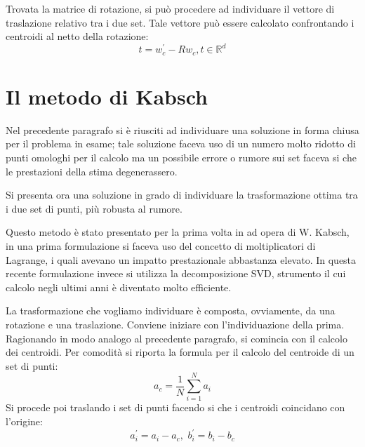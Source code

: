 Trovata la matrice di rotazione, si può procedere ad individuare il vettore di traslazione relativo tra i due set. Tale vettore può essere calcolato confrontando i centroidi al netto della rotazione:
\begin{equation}
t = w_c^{'} - Rw_c, t \in \mathbb{R}^d
\end{equation}

\section{Il metodo di Kabsch}
\label{sec:kabsch}

Nel precedente paragrafo si è riusciti ad individuare una soluzione in forma chiusa per il problema in esame; tale soluzione faceva uso di un numero molto ridotto di punti omologhi per il calcolo ma un possibile errore o rumore sui set faceva si che le prestazioni della stima degenerassero.

Si presenta ora una soluzione in grado di individuare la trasformazione ottima tra i due set di punti, più robusta al rumore.

Questo metodo è stato presentato per la prima volta in \cite{bib1} ad opera di W. Kabsch, in una prima formulazione si faceva uso del concetto di moltiplicatori di Lagrange, i quali avevano un impatto prestazionale abbastanza elevato. In questa recente formulazione invece si utilizza la decomposizione SVD, strumento il cui calcolo negli ultimi anni è diventato molto efficiente.

La trasformazione che vogliamo individuare è composta, ovviamente, da una rotazione e una traslazione. Conviene iniziare con l'individuazione della prima. Ragionando in modo analogo al precedente paragrafo, si comincia con il calcolo dei centroidi. Per comodità si riporta la formula per il calcolo del centroide di un set di punti:
\begin{equation}
	\label{rot:eq:cent}
	a_c = \frac{1}{N}\sum_{i = 1}^{N}a_i
\end{equation}
Si procede poi traslando i set di punti facendo si che i centroidi coincidano con l'origine:
\begin{equation}
\label{rot:eq:redef}
a_i^{'} = a_i - a_c, \, \, 
b_i^{'} = b_i - b_c
\end{equation}

